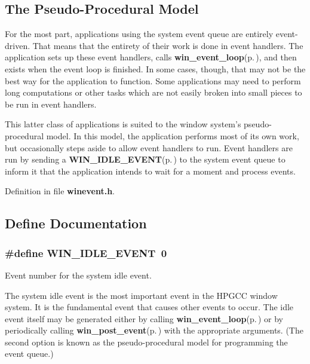\subsection{The Pseudo-Procedural Model}\label{winevent_8h_proc}
For the most part, applications using the system event queue are entirely event-driven. That means that the entirety of their work is done in event handlers. The application sets up these event handlers, calls {\bf win\_\-event\_\-loop}{\rm (p.\,\pageref{winevent_8h_a7})}, and then exists when the event loop is finished. In some cases, though, that may not be the best way for the application to function. Some applications may need to perform long computations or other tasks which are not easily broken into small pieces to be run in event handlers.

This latter class of applications is suited to the window system's pseudo-procedural model. In this model, the application performs most of its own work, but occasionally steps aside to allow event handlers to run. Event handlers are run by sending a {\bf WIN\_\-IDLE\_\-EVENT}{\rm (p.\,\pageref{winevent_8h_a0})} to the system event queue to inform it that the application intends to wait for a moment and process events. 

Definition in file {\bf winevent.h}.

\subsection{Define Documentation}
\subsubsection{\setlength{\rightskip}{0pt plus 5cm}\#define WIN\_\-IDLE\_\-EVENT~0}\label{winevent_8h_a0}


Event number for the system idle event. 

The system idle event is the most important event in the HPGCC window system. It is the fundamental event that causes other events to occur. The idle event itself may be generated either by calling {\bf win\_\-event\_\-loop}{\rm (p.\,\pageref{winevent_8h_a7})} or by periodically calling {\bf win\_\-post\_\-event}{\rm (p.\,\pageref{winevent_8h_a4})} with the appropriate arguments. (The second option is known as the pseudo-procedural model for programming the event queue.)

